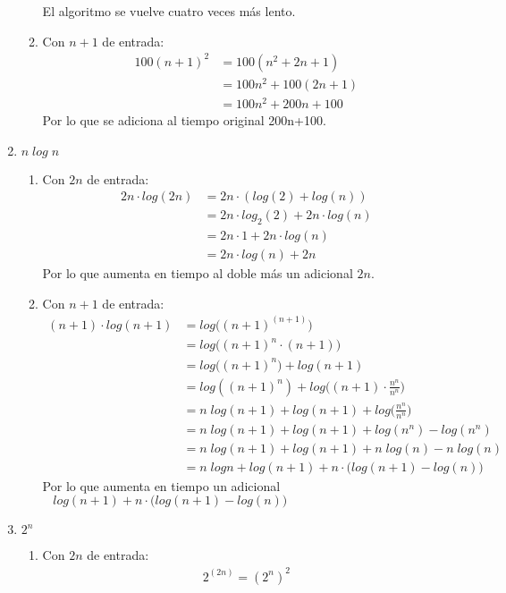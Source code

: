 \documentclass[12pt]{article}
\newenvironment{boenumerate}
               {\begin{enumerate}\renewcommand\labelenumi{\textbf{\theenumi.}}}
               {\end{enumerate}}
\begin{document}
\begin{boenumerate}
\begin{enumerate}
\begin{enumerate}
      El algoritmo se vuelve cuatro veces más lento.
    \item Con $n+1$ de entrada:
      \begin{align}
        100(n+1)^2 &= 100(n^2+2n+1) \\
        &= 100n^2+100(2n+1) \\
        &= 100n^2+200n+100
      \end{align}
      Por lo que se adiciona al tiempo original 200n+100.
    \end{enumerate}
  \item $n\;log\;n$
    \begin{enumerate}
    \item Con $2n$ de entrada:
      \begin{align}
        2n\cdot log(2n) &= 2n\cdot(log(2)+log(n)) \\
        &= 2n \cdot log_2(2) + 2n \cdot log(n) \\
        &= 2n \cdot 1 + 2n \cdot log(n) \\
        &= 2n \cdot log(n) + 2n 
      \end{align}
      Por lo que aumenta en tiempo al doble más un adicional $2n$.
    \item Con $n+1$ de entrada:
      \begin{align}
        (n+1) \cdot log(n+1) &= log\big((n+1)^{(n+1)}\big) \\
        &= log\big((n+1)^n \cdot (n+1)\big) \\
        &= log\big((n+1)^n\big) + log(n+1) \\
        &= log((n+1)^n) + log\Big((n+1) \cdot \frac{n^n}{n^n}\Big) \\
        &= n\;log(n+1) + log(n+1) + log\Big(\frac{n^n}{n^n}\Big) \\
        &= n\;log(n+1) + log(n+1) + log(n^n) - log(n^n) \\
        &= n\;log(n+1) + log(n+1) + n\;log(n) - n\;log(n) \\
        &= n\;logn + log(n+1) + n\cdot\big(log(n+1)-log(n)\big)
      \end{align}
      Por lo que aumenta en tiempo un adicional $\;\;\;log(n+1) + n\cdot\big(log(n+1)-log(n)\big)$
    \end{enumerate}
  \item $2^n$
    \begin{enumerate}
    \item Con $2n$ de entrada:
      \begin{align}
        2^{(2n)} = (2^n)^2
      \end{align}

\end{enumerate}
\end{enumerate}
\end{boenumerate}
\end{document}
